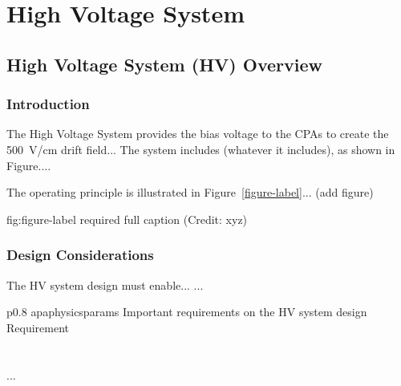 \chapter{High Voltage System}
\label{ch:fdsp-hv}

\section{High Voltage System (HV) Overview}
\label{sec:fdsp-hv-ov}


\subsection{Introduction}
\label{sec:fdsp-hv-intro}

The High Voltage System provides the bias voltage to the CPAs to create the \SI{500}{V/cm} drift field...
The system includes (whatever it includes), as shown in Figure.... 


The operating principle is illustrated in Figure~\ref{figure-label}... (add figure)

\begin{dunefigure}{fig:figure-label}
{required full caption (Credit: xyz)}
\end{dunefigure}

\subsection{Design Considerations}
\label{sec:fdsp-hv-des-consid}


The HV system design must enable... 
...


\begin{dunetable}
{p{0.8\textwidth}}
{apaphysicsparams}
{Important requirements on the HV system design}   
Requirement  \\ \toprowrule
  \\ \colhline
   \\ \colhline
 ...\\ 
\end{dunetable}

